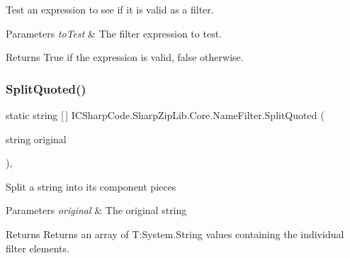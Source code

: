 Test an expression to see if it is valid as a filter. 


\begin{DoxyParams}{Parameters}
{\em to\+Test} & The filter expression to test.\\
\hline
\end{DoxyParams}
\begin{DoxyReturn}{Returns}
True if the expression is valid, false otherwise.
\end{DoxyReturn}
\mbox{\label{class_i_c_sharp_code_1_1_sharp_zip_lib_1_1_core_1_1_name_filter_a8f148c5fbbd3a28f27b9602865333cb9}} 
\subsubsection{\texorpdfstring{Split\+Quoted()}{SplitQuoted()}}
{\footnotesize\ttfamily static string \mbox{[}$\,$\mbox{]} I\+C\+Sharp\+Code.\+Sharp\+Zip\+Lib.\+Core.\+Name\+Filter.\+Split\+Quoted (\begin{DoxyParamCaption}\item[{string}]{original }\end{DoxyParamCaption})\hspace{0.3cm}{\ttfamily [inline]}, {\ttfamily [static]}}



Split a string into its component pieces 


\begin{DoxyParams}{Parameters}
{\em original} & The original string\\
\hline
\end{DoxyParams}
\begin{DoxyReturn}{Returns}
Returns an array of T\+:\+System.\+String values containing the individual filter elements.
\end{DoxyReturn}
\mbox{\label{class_i_c_sharp_code_1_1_sharp_zip_lib_1_1_core_1_1_name_filter_a4986231d79362a5ff8e08cffd6a747eb}} 
